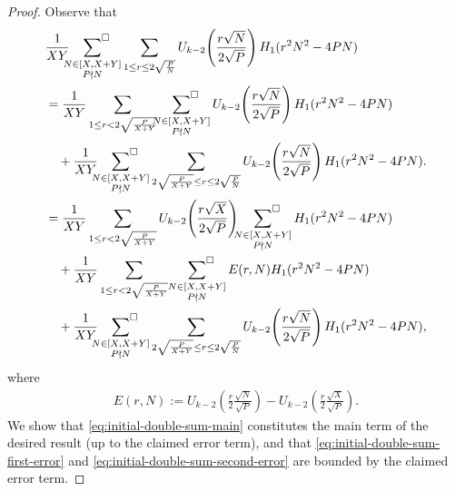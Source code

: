 \documentclass[12pt,letterpaper,reqno]{amsart}
\theoremstyle{plain}
\theoremstyle{definition}
\numberwithin{equation}{section}
\numberwithin{figure}{section}
\numberwithin{table}{section}
\newcommand{\lrp}[1]{\!\left(#1\right)}
\begin{document}
\begin{proof}
    Observe that 
    \begin{align}
        & \frac{1}{XY} \sideset{}{^\square}\sum_{\substack{N\in[X,X+Y] \\ P\nmid N}}\sum_{1\leq r \leq 2\sqrt{\frac{P}{N}}} U_{k-2}\lrp{\frac{r\sqrt{N}}{2\sqrt{P}}} H_1(r^2N^2-4PN) \\
        &=\frac{1}{XY}
        \sum_{1\leq r< 2\sqrt{\frac{P}{X+Y}}}\sideset{}{^\square} \sum_{\substack{N\in [X,X+Y] \\ P \nmid N}}
        U_{k-2}\lrp{\frac{r\sqrt{N}}{2\sqrt{P}}} H_1(r^2N^2-4PN)\\
        &  \quad + \frac{1}{XY}
        \sideset{}{^\square}\sum_{\substack{N\in[X,X+Y] \\ P\nmid N}}
        \sum_{2\sqrt{\frac{P}{X+Y}}\le r \le 2\sqrt{\frac{P}{N}}}  U_{k-2}\lrp{\frac{r\sqrt{N}}{2\sqrt{P}}} H_1(r^2N^2-4PN). \\
        &= \frac{1}{XY}\sum_{1\leq r< 2\sqrt{\frac{P{}}{X+Y}}} U_{k-2}\lrp{\frac{r\sqrt{X}}{2\sqrt{P}}}
        \sideset{}{^\square}\sum_{\substack{N\in[X,X+Y]\\ P\nmid N}} H_1(r^2N^2-4PN) \label{eq:initial-double-sum-main} \\
        &\quad + \frac{1}{XY}\sum_{1\leq r< 2\sqrt{\frac{P{}}{X+Y}}}\,\, \sideset{}{^\square }\sum_{\substack{N\in[X,X+Y]\\ P\nmid N}} E(r,N)H_1(r^2N^2-4PN)  \label{eq:initial-double-sum-first-error} \\
        &\quad + \frac{1}{XY}
        \sideset{}{^\square}\sum_{\substack{N\in[X,X+Y] \\ P\nmid N}}
        \sum_{2\sqrt{\frac{P}{X+Y}}\le r \le 2\sqrt{\frac{P}{N}}}  U_{k-2}\lrp{\frac{r\sqrt{N}}{2\sqrt{P}}} H_1(r^2N^2-4PN),
        \label{eq:initial-double-sum-second-error}
    \end{align}
    where 
    \begin{align} \label{eqn:def-E(r,N)}
        E(r,N) := U_{k-2}\lrp{\frac{r}{2}\frac{\sqrt{N}}{\sqrt{P}}}-
        U_{k-2}\lrp{\frac{r}{2}\frac{\sqrt{X}}{\sqrt{P}}}.
    \end{align}
    We show that \eqref{eq:initial-double-sum-main} constitutes the main term of the desired result (up to the claimed error term), and that
    \eqref{eq:initial-double-sum-first-error}
    and
    \eqref{eq:initial-double-sum-second-error}
    are bounded by the claimed error term.



\end{proof}
\end{document}
